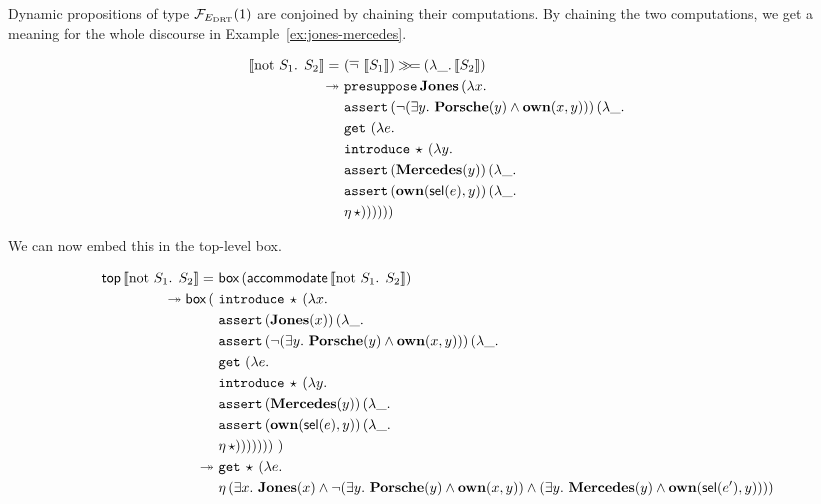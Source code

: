 Dynamic propositions of type $\mathcal{F}_{E_{\mathrm{DRT}}}(1)$ are conjoined by chaining
their computations. By chaining the two computations, we get a meaning for
the whole discourse in Example~\ref{ex:jones-mercedes}.

\begin{align*}
  \llbracket \text{not $S_1$. $S_2$} \rrbracket = &\ (\mathop{\overline{\lnot}}\ \llbracket S_1 \rrbracket) \mathbin{\gg\!=} (\lambda \_.\, \llbracket S_2 \rrbracket) \\
\twoheadrightarrow &\ \mathtt{presuppose}\,\textbf{Jones}\,(\lambda x.\,  \\
     &\ \mathtt{assert}\,(\lnot (\exists y.\ \textbf{Porsche}(y) \land \textbf{own}(x, y)))\,(\lambda \_.\,  \\
     &\ \mathtt{get}\,\,(\lambda e.\,  \\
     &\ \mathtt{introduce}\,\star\,(\lambda y.\,  \\
     &\ \mathtt{assert}\,(\textbf{Mercedes}(y))\,(\lambda \_.\,  \\
     &\ \mathtt{assert}\,(\textbf{own}(\textsf{sel}(e), y))\,(\lambda \_.\,  \\
     &\ \eta\,\star))))))
\end{align*}

We can now embed this in the top-level box.

\begin{align*}
  \ap{\TOP}{\sem{\text{not $S_1$. $S_2$}}} = &\ \ap{\BOX}{(\ap{\accommodate}{\sem{\text{not $S_1$. $S_2$}}})} \\
\tto \ap{\BOX}{(
     &\ \app{\op{introduce}}{\star}{(\lam{x}{ \\
     &\ \app{\op{assert}}{(\obj{Jones}(x))}{(\lam{\_}{ \\
     &\ \app{\op{assert}}{(\lnot (\exists y.\ \obj{Porsche}(y) \land \obj{own}(x, y)))}{(\lam{\_}{ \\
     &\ \app{\op{get}}{}{(\lam{e}{ \\
     &\ \app{\op{introduce}}{\star}{(\lam{y}{ \\
     &\ \app{\op{assert}}{(\obj{Mercedes}(y))}{(\lam{\_}{ \\
     &\ \app{\op{assert}}{(\obj{own}(\sel(e), y))}{(\lam{\_}{ \\
     &\ \etaE{\star}})}})}})}})}})}})}})}\ )} \\
\tto &\ \app{\op{get}}{\star}{(\lam{e}{ \\
     &\ \etaE{(\exists x.\
          \obj{Jones}(x) \land
          \lnot (\exists y.\ \obj{Porsche}(y) \land \obj{own}(x, y)) \land
          (\exists y.\ \obj{Mercedes}(y) \land \obj{own}(\sel(e'), y)))}})}
\end{align*}

